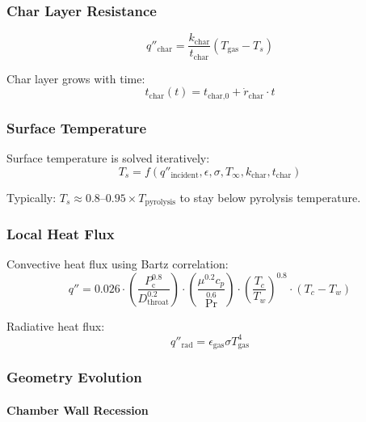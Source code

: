 \documentclass[12pt,a4paper]{article}
\newcommand{\Pc}{P_{\text{c}}}
\begin{document}
\subsubsection{Char Layer Resistance}

\begin{equation}
q''_{\text{char}} = \frac{k_{\text{char}}}{t_{\text{char}}} (T_{\text{gas}} - T_s)
\end{equation}

Char layer grows with time:
\begin{equation}
t_{\text{char}}(t) = t_{\text{char,0}} + \dot{r}_{\text{char}} \cdot t
\end{equation}

\subsubsection{Surface Temperature}

Surface temperature is solved iteratively:
\begin{equation}
T_s = f(q''_{\text{incident}}, \epsilon, \sigma, T_{\infty}, k_{\text{char}}, t_{\text{char}})
\end{equation}

Typically: $T_s \approx 0.8$--$0.95 \times T_{\text{pyrolysis}}$ to stay below pyrolysis temperature.

\subsubsection{Local Heat Flux}

Convective heat flux using Bartz correlation:
\begin{equation}
q'' = 0.026 \cdot \left(\frac{\Pc^{0.8}}{D_{\text{throat}}^{0.2}}\right) \cdot \left(\frac{\mu^{0.2} c_p}{\Pr^{0.6}}\right) \cdot \left(\frac{T_c}{T_w}\right)^{0.8} \cdot (T_c - T_w)
\end{equation}

Radiative heat flux:
\begin{equation}
q''_{\text{rad}} = \epsilon_{\text{gas}} \sigma T_{\text{gas}}^4
\end{equation}

\subsubsection{Geometry Evolution}

\paragraph{Chamber Wall Recession}
\end{document}
